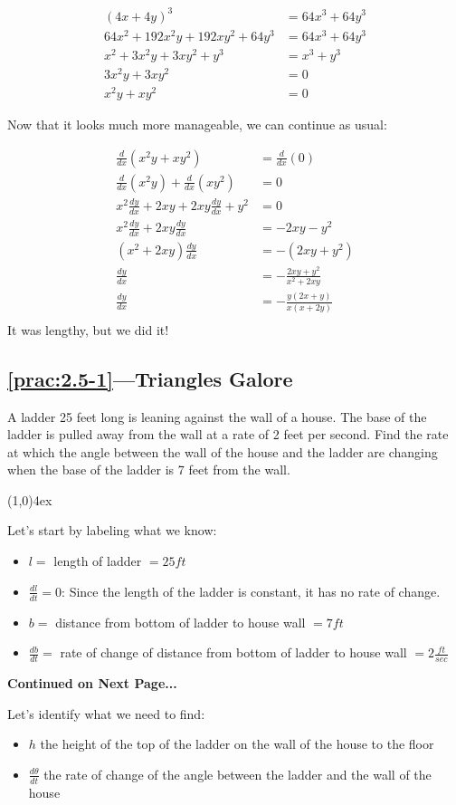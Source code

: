 \documentclass{MathNotes}
\newcommand{\br}{
\begin{center}
\line(1,0){4ex}
\end{center}}
\newcommand{\continued}{
\mbox{}
\vfill
\textbf{Continued on Next Page...}\newpage
}
\begin{document}
\begin{align*}
    (4x+4y)^3&=64x^3+64y^3\\
    64x^2+192x^2y+192xy^2+64y^3&=64x^3+64y^3\\
    x^2+3x^2y+3xy^2+y^3&=x^3+y^3\\
    3x^2y+3xy^2&=0\\
    x^2y+xy^2&=0
\end{align*}

Now that it looks much more manageable, we can continue as usual:

\begin{align*}
    \frac{d}{dx}(x^2y+xy^2)&=\frac{d}{dx}(0)\\
    \frac{d}{dx}(x^2y)+\frac{d}{dx}(xy^2)&=0\\
    x^2\frac{dy}{dx}+2xy+2xy\frac{dy}{dx}+y^2&=0\\
    x^2\frac{dy}{dx}+2xy\frac{dy}{dx}&=-2xy-y^2\\
    (x^2+2xy)\frac{dy}{dx}&=-(2xy+y^2)\\
    \frac{dy}{dx}&=-\frac{2xy+y^2}{x^2+2xy}\\
    \frac{dy}{dx}&=-\frac{y(2x+y)}{x(x+2y)}\\
\end{align*}
It was lengthy, but we did it!
\subsection*{\ref{prac:2.5-1}---Triangles Galore}\label{ans:2.5-1}
A ladder 25 feet long is leaning against the wall of a house. The base
of the ladder is pulled away from the wall at a rate of 2 feet per
second. Find the rate at which the angle between the wall of the house and the
ladder are changing when the base of the ladder is 7 feet from the wall.
\br
Let's start by labeling what we know:
\begin{multicols}{2}
    \begin{itemize}
        \item $l=$ length of ladder $=25ft$
        \item $\frac{dl}{dt}=0$: Since the length of the ladder is
            constant, it has no rate of change.
        \item $b=$ distance from bottom of ladder to house wall $=7ft$
        \item $\frac{db}{dt}=$ rate of change of distance from bottom of ladder 
            to house wall $=2\frac{ft}{sec}$
    \end{itemize}
\end{multicols}
\continued
Let's identify what we need to find:
\begin{itemize}
    \item $h$ the height of the top of the ladder on the wall of the house
        to the floor
    \item $\frac{d\theta}{dt}$ the rate of change of the angle between the
        ladder and the wall of the house
\end{itemize}
\end{document}
